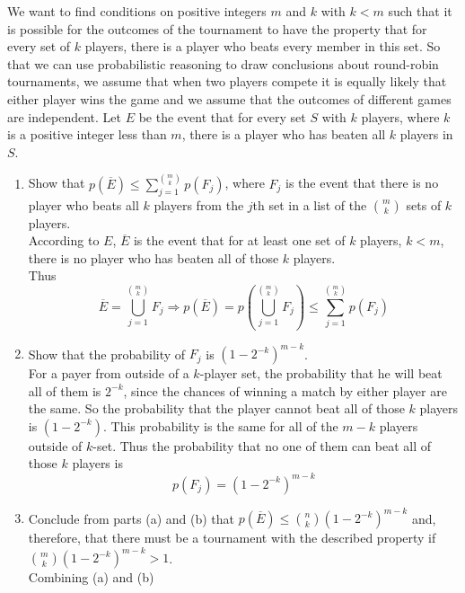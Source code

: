 \documentclass[a4paper]{article}
\begin{document}
We want to find conditions on positive integers $m$ and $k$ with $k<m$ such that it is possible for the outcomes of the tournament to have the property that for every set of $k$ players, there is a player who beats every member in this set. So that we can use probabilistic reasoning to draw conclusions about round-robin tournaments, we assume that when two players compete it is equally likely that either player wins the game and we assume that the outcomes of different games are independent. Let $E$ be the event that for every set $S$ with $k$ players, where $k$ is a positive integer less than $m$, there is a player who has beaten all $k$ players in $S$.
\begin{enumerate}[label=\alph*)]
	\item Show that $p(\overline{E}) \leq \sum_{j=1}^{m \choose k} p(F_j)$, where $F_j$ is the event that there is no player who beats all $k$ players from the $j$th set in a list of the ${m \choose k}$ sets of $k$ players. \\
	      According to $E$, $\overline{E}$ is the event that for at least one set of $k$ players, $k<m$, there is no player who has beaten all of those $k$ players. \\
	      Thus
	      \begin{equation*}
		      \overline{E} = \bigcup_{j=1}^{m \choose k} F_j \Rightarrow p(\overline{E}) = p(\bigcup_{j=1}^{m \choose k} F_j) \leq \sum_{j=1}^{m \choose k} p(F_j)
	      \end{equation*}
	\item Show that the probability of $F_j$ is $(1-2^{-k})^{m-k}$. \\
	      For a payer from outside of a $k$-player set, the probability that he will beat all of them is $2^{-k}$, since the chances of winning a match by either player are the same. So the probability that the player cannot beat all of those $k$ players is $(1-2^{-k})$. This probability is the same for all of the $m-k$ players outside of $k$-set. Thus the probability that no one of them can beat all of those $k$ players is
	      \begin{equation*}
		      p(F_j) = (1-2^{-k})^{m-k}
	      \end{equation*}
	\item Conclude from parts (a) and (b) that $p(\overline{E})\leq {n \choose k}(1-2^{-k})^{m-k}$ and, therefore, that there must be a tournament with the described property if ${m\choose k}(1-2^{-k})^{m-k} >1$. \\
	      Combining (a) and (b)
	      \begin{align*}

\end{align*}
\end{enumerate}
\end{document}
